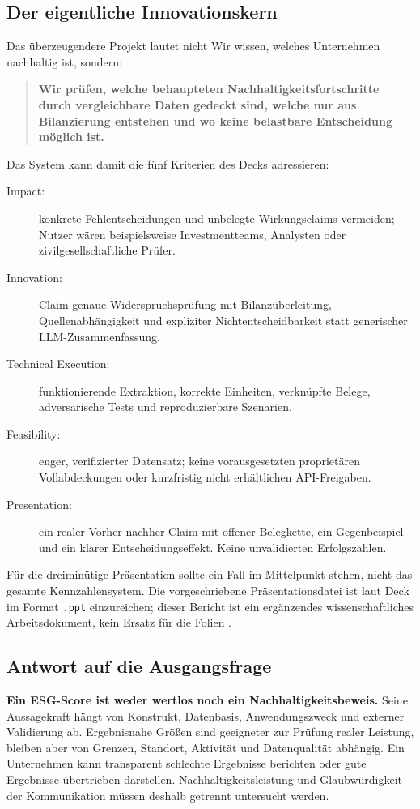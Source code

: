 \documentclass[11pt,a4paper]{article}
\begin{document}
\subsection{Der eigentliche Innovationskern}
Das überzeugendere Projekt lautet nicht \glqq Wir wissen, welches Unternehmen nachhaltig ist\grqq, sondern:
\begin{quote}
\textbf{Wir prüfen, welche behaupteten Nachhaltigkeitsfortschritte durch vergleichbare Daten gedeckt sind, welche nur aus Bilanzierung entstehen und wo keine belastbare Entscheidung möglich ist.}
\end{quote}
Das System kann damit die fünf Kriterien des Decks adressieren:
\begin{description}
\item[Impact:] konkrete Fehlentscheidungen und unbelegte Wirkungsclaims vermeiden; Nutzer wären beispielsweise Investmentteams, Analysten oder zivilgesellschaftliche Prüfer.
\item[Innovation:] Claim-genaue Widerspruchsprüfung mit Bilanzüberleitung, Quellenabhängigkeit und expliziter Nichtentscheidbarkeit statt generischer LLM-Zusammenfassung.
\item[Technical Execution:] funktionierende Extraktion, korrekte Einheiten, verknüpfte Belege, adversarische Tests und reproduzierbare Szenarien.
\item[Feasibility:] enger, verifizierter Datensatz; keine vorausgesetzten proprietären Vollabdeckungen oder kurzfristig nicht erhältlichen API-Freigaben.
\item[Presentation:] ein realer Vorher-nachher-Claim mit offener Belegkette, ein Gegenbeispiel und ein klarer Entscheidungseffekt. Keine unvalidierten Erfolgszahlen.
\end{description}
Für die dreiminütige Präsentation sollte ein Fall im Mittelpunkt stehen, nicht das gesamte Kennzahlensystem. Die vorgeschriebene Präsentationsdatei ist laut Deck im Format \texttt{.ppt} einzureichen; dieser Bericht ist ein ergänzendes wissenschaftliches Arbeitsdokument, kein Ersatz für die Folien \cite{deck}.

\subsection{Antwort auf die Ausgangsfrage}
\textbf{Ein ESG-Score ist weder wertlos noch ein Nachhaltigkeitsbeweis.} Seine Aussagekraft hängt von Konstrukt, Datenbasis, Anwendungszweck und externer Validierung ab. Ergebnisnahe Größen sind geeigneter zur Prüfung realer Leistung, bleiben aber von Grenzen, Standort, Aktivität und Datenqualität abhängig. Ein Unternehmen kann transparent schlechte Ergebnisse berichten oder gute Ergebnisse übertrieben darstellen. Nachhaltigkeitsleistung und Glaubwürdigkeit der Kommunikation müssen deshalb getrennt untersucht werden.
\end{document}
